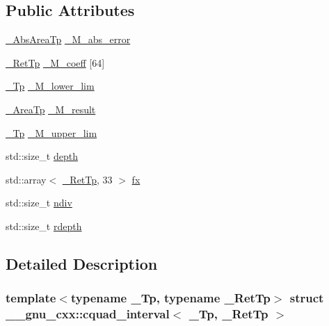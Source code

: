 \subsection*{Public Attributes}
\begin{DoxyCompactItemize}
\item 
\hyperlink{struct____gnu__cxx_1_1cquad__interval_a3d2a1bbd0064e2a6c6edbcd514585311}{\+\_\+\+Abs\+Area\+Tp} \hyperlink{struct____gnu__cxx_1_1cquad__interval_a63edd4bbb3614217b24256c7a3b305b8}{\+\_\+\+M\+\_\+abs\+\_\+error}
\item 
\hyperlink{namespace____gnu__cxx_a886e03ece3d53ff7fa6c098a40f93fa5}{\+\_\+\+Ret\+Tp} \hyperlink{struct____gnu__cxx_1_1cquad__interval_a852e4c25203cf39c21e0eeb16dd70bda}{\+\_\+\+M\+\_\+coeff} \mbox{[}64\mbox{]}
\item 
\hyperlink{namespace____gnu__cxx_a3b19a9c800ca194374ef9172290f7d79}{\+\_\+\+Tp} \hyperlink{struct____gnu__cxx_1_1cquad__interval_a075cfcb47735ad5b69190a2246780475}{\+\_\+\+M\+\_\+lower\+\_\+lim}
\item 
\hyperlink{struct____gnu__cxx_1_1cquad__interval_aceac510aa3323d55b31555f96133cb40}{\+\_\+\+Area\+Tp} \hyperlink{struct____gnu__cxx_1_1cquad__interval_abb2d5586cea60c80bd99051f2ba27063}{\+\_\+\+M\+\_\+result}
\item 
\hyperlink{namespace____gnu__cxx_a3b19a9c800ca194374ef9172290f7d79}{\+\_\+\+Tp} \hyperlink{struct____gnu__cxx_1_1cquad__interval_a60b4fdf494ba274bce6271fd1fa5aa69}{\+\_\+\+M\+\_\+upper\+\_\+lim}
\item 
std\+::size\+\_\+t \hyperlink{struct____gnu__cxx_1_1cquad__interval_af4a321c6e64f7de6ab0cbf4ebd4381a7}{depth}
\item 
std\+::array$<$ \hyperlink{namespace____gnu__cxx_a886e03ece3d53ff7fa6c098a40f93fa5}{\+\_\+\+Ret\+Tp}, 33 $>$ \hyperlink{struct____gnu__cxx_1_1cquad__interval_ab3c4ae7b9f1ad8fe99f385e388514fae}{fx}
\item 
std\+::size\+\_\+t \hyperlink{struct____gnu__cxx_1_1cquad__interval_a79dbc370bba05fb7449645054889d308}{ndiv}
\item 
std\+::size\+\_\+t \hyperlink{struct____gnu__cxx_1_1cquad__interval_a82e60c6a4a1c360f09829fb6480e2888}{rdepth}
\end{DoxyCompactItemize}


\subsection{Detailed Description}
\subsubsection*{template$<$typename \+\_\+\+Tp, typename \+\_\+\+Ret\+Tp$>$\newline
struct \+\_\+\+\_\+gnu\+\_\+cxx\+::cquad\+\_\+interval$<$ \+\_\+\+Tp, \+\_\+\+Ret\+Tp $>$}

